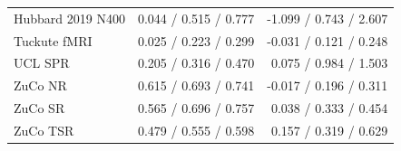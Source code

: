 \begin{table}[p]
\begin{tabular}{lrr}
Hubbard 2019 N400 & 0.044 / 0.515 / 0.777 & -1.099 / 0.743 / 2.607 \\
Tuckute fMRI & 0.025 / 0.223 / 0.299 & -0.031 / 0.121 / 0.248 \\
UCL SPR & 0.205 / 0.316 / 0.470 & 0.075 / 0.984 / 1.503 \\
ZuCo NR & 0.615 / 0.693 / 0.741 & -0.017 / 0.196 / 0.311 \\
ZuCo SR & 0.565 / 0.696 / 0.757 & 0.038 / 0.333 / 0.454 \\
ZuCo TSR & 0.479 / 0.555 / 0.598 & 0.157 / 0.319 / 0.629 \\
\bottomrule\end{tabular}\end{table}
